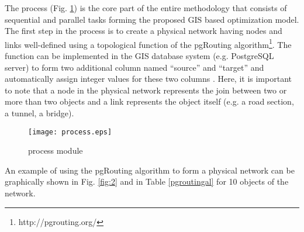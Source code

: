\documentclass[a4paper,3p,times,authoryear]{elsarticle}
\begin{document}
The process (Fig. \ref{process}) is the core part of the entire methodology that consists of sequential and parallel tasks forming the proposed GIS based optimization model. The first step in the process is to create a physical network having nodes and links well-defined using a topological function of the pgRouting algorithm\footnote{http://pgrouting.org/}. The function can be implemented in the GIS database system (e.g. PostgreSQL server) to form two additional column named ``source'' and ``target'' and automatically assign integer values for these two columns \citep{Obe2015}. Here, it is important to note that a node in the physical network represents the join between two or more than two objects and a link represents the object itself (e.g. a road section, a tunnel, a bridge).
%
%
\begin{figure}[H]
\begin{center}
\texttt{[image: process.eps]}
\caption{process module}\label{process}
\end{center}
\end{figure}
An example of using the pgRouting algorithm to form a physical network can be graphically shown in Fig. \ref{fig:2} and in Table \ref{pgroutingal} for 10 objects of the network.
%

%
\end{document}
